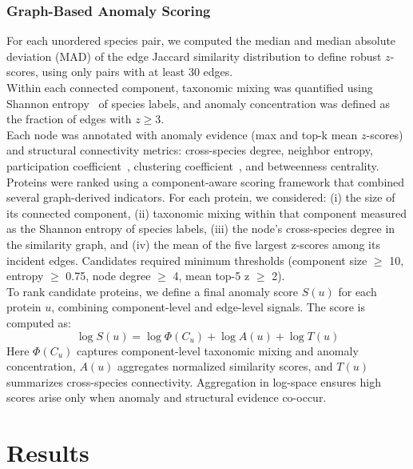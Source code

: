 \documentclass[11pt]{article}
\begin{document}
	\subsubsection{Graph-Based Anomaly Scoring}
	For each unordered species pair, we computed the median and median absolute deviation (MAD) of the edge Jaccard similarity distribution to define robust $z$-scores, using only pairs with at least 30 edges.\\
	Within each connected component, taxonomic mixing was quantified using Shannon entropy~\cite{ShannonEntropy} of species labels, and anomaly concentration was defined as the fraction of edges with $z\ge3$.\\
	Each node was annotated with anomaly evidence (max and top-k mean $z$-scores) and structural connectivity metrics: cross-species degree, neighbor entropy, participation coefficient~\cite{Guimera2005}, clustering coefficient~\cite{Watts1998}, and betweenness centrality.\\
	Proteins were ranked using a component-aware scoring framework that combined several graph-derived indicators. For each protein, we considered: (i) the size of its connected component, (ii) taxonomic mixing within that component measured as the Shannon entropy of species labels, (iii) the node’s cross-species degree in the similarity graph, and (iv) the mean of the five largest z-scores among its incident edges. Candidates required minimum thresholds (component size $\geq$ 10, entropy $\geq$ 0.75, node degree $\geq$ 4, mean top-5 z $\geq$ 2).\\
	To rank candidate proteins, we define a final anomaly score $S(u)$ for each protein $u$, combining component-level and edge-level signals. The score is computed as:
	\begin{equation*}
	\log S(u) = \log \Phi(C_u) + \log A(u) + \log T(u)
	\end{equation*}
	\noindent
	Here $\Phi(C_u)$ captures component-level taxonomic mixing and anomaly concentration, $A(u)$ aggregates normalized similarity scores, and $T(u)$ summarizes cross-species connectivity. Aggregation in log-space ensures high scores arise only when anomaly and structural evidence co-occur. 
	
	\FloatBarrier
	
	\section{Results}
\end{document}
